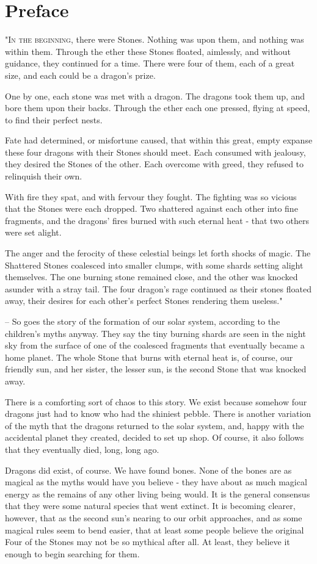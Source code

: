 \chapter{Preface}
\lettrine{"I}{n the beginning}, there were Stones. Nothing was upon them, and nothing was within them. Through the ether these Stones floated, aimlessly, and without guidance, they continued for a time.
There were four of them, each of a great size, and each could be a dragon's prize.

One by one, each stone was met with a dragon.
The dragons took them up, and bore them upon their backs.
Through the ether each one pressed, flying at speed, to find their perfect nests.

Fate had determined, or misfortune caused, that within this great, empty expanse these four dragons with their Stones should meet.
Each consumed with jealousy, they desired the Stones of the other.
Each overcome with greed, they refused to relinquish their own.

With fire they spat, and with fervour they fought.
The fighting was so vicious that the Stones were each dropped.
Two shattered against each other into fine fragments, and the dragons' fires burned with such eternal heat - that two others were set alight.

The anger and the ferocity of these celestial beings let forth shocks of magic.
The Shattered Stones coalesced into smaller clumps, with some shards setting alight themselves.
The one burning stone remained close, and the other was knocked asunder with a stray tail.
The four dragon's rage continued as their stones floated away, their desires for each other's perfect Stones rendering them useless."


-- So goes the story of the formation of our solar system, according to the children's myths anyway.
They say the tiny burning shards are seen in the night sky from the surface of one of the coalesced fragments that eventually became a home planet.
The whole Stone that burns with eternal heat is, of course, our friendly sun, and her sister, the lesser sun, is the second Stone that was knocked away.

There is a comforting sort of chaos to this story. 
We exist because somehow four dragons just had to know who had the shiniest pebble.
There is another variation of the myth that the dragons returned to the solar system, and, happy with the accidental planet they created, decided to set up shop.
Of course, it also follows that they eventually died, long, long ago.

Dragons did exist, of course. We have found bones. None of the bones are as magical as the myths would have you believe - they have about as much magical energy as the remains of any other living being would.
It is the general consensus that they were some natural species that went extinct.
It is becoming clearer, however, that as the second sun's nearing to our orbit approaches, and as some magical rules seem to bend easier, that at least some people believe the original Four of the Stones may not be so mythical after all. 
At least, they believe it enough to begin searching for them.
\cleardoublepage   %